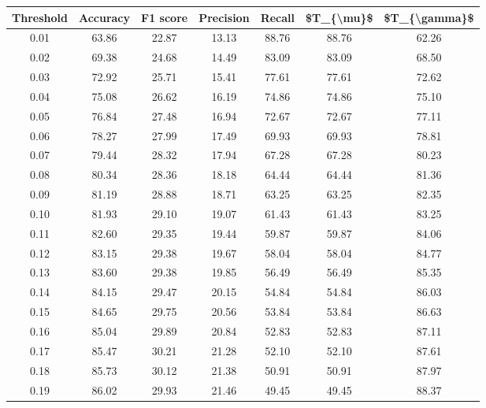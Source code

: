 \begin{tabular}{|c|c|c|c|c|c|c|}
\hline
 Threshold &  Accuracy &  F1 score &  Precision &  Recall &  \$T\_\{\textbackslash mu\}\$ &  \$T\_\{\textbackslash gamma\}\$ \\
\hline
      0.01 &     63.86 &     22.87 &      13.13 &   88.76 &      88.76 &         62.26 \\
      0.02 &     69.38 &     24.68 &      14.49 &   83.09 &      83.09 &         68.50 \\
      0.03 &     72.92 &     25.71 &      15.41 &   77.61 &      77.61 &         72.62 \\
      0.04 &     75.08 &     26.62 &      16.19 &   74.86 &      74.86 &         75.10 \\
      0.05 &     76.84 &     27.48 &      16.94 &   72.67 &      72.67 &         77.11 \\
      0.06 &     78.27 &     27.99 &      17.49 &   69.93 &      69.93 &         78.81 \\
      0.07 &     79.44 &     28.32 &      17.94 &   67.28 &      67.28 &         80.23 \\
      0.08 &     80.34 &     28.36 &      18.18 &   64.44 &      64.44 &         81.36 \\
      0.09 &     81.19 &     28.88 &      18.71 &   63.25 &      63.25 &         82.35 \\
      0.10 &     81.93 &     29.10 &      19.07 &   61.43 &      61.43 &         83.25 \\
      0.11 &     82.60 &     29.35 &      19.44 &   59.87 &      59.87 &         84.06 \\
      0.12 &     83.15 &     29.38 &      19.67 &   58.04 &      58.04 &         84.77 \\
      0.13 &     83.60 &     29.38 &      19.85 &   56.49 &      56.49 &         85.35 \\
      0.14 &     84.15 &     29.47 &      20.15 &   54.84 &      54.84 &         86.03 \\
      0.15 &     84.65 &     29.75 &      20.56 &   53.84 &      53.84 &         86.63 \\
      0.16 &     85.04 &     29.89 &      20.84 &   52.83 &      52.83 &         87.11 \\
      0.17 &     85.47 &     30.21 &      21.28 &   52.10 &      52.10 &         87.61 \\
      0.18 &     85.73 &     30.12 &      21.38 &   50.91 &      50.91 &         87.97 \\
      0.19 &     86.02 &     29.93 &      21.46 &   49.45 &      49.45 &         88.37 \\

\end{tabular}
